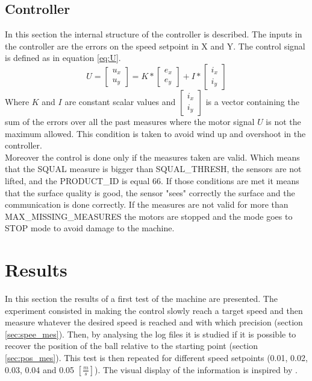 \documentclass[12pt,a4paper, twoside]{article}
\begin{document}
\subsection{Controller} \label{sec:controller}
In this section the internal structure of the controller is described.
The inputs in the controller are the errors on the speed setpoint in X and Y. The control signal is defined as in equation \ref{eq:U}.
\begin{equation}\label{eq:U}
U = 
\begin{bmatrix}
u_x\\
u_y
\end{bmatrix}
= K * 
\begin{bmatrix}
e_x\\
e_y
\end{bmatrix} + I *
\begin{bmatrix}
i_x\\
i_y
\end{bmatrix} 
\end{equation}
Where $K$ and $I$ are constant scalar values and $\begin{bmatrix}i_x\\i_y\end{bmatrix}$ is a vector containing the sum of the errors over all the past measures where the motor signal $U$ is not the maximum allowed. This condition is taken to avoid wind up and overshoot in the controller.\\
Moreover the control is done only if the measures taken are valid. Which means that the SQUAL measure is bigger than SQUAL\_THRESH, the sensors are not lifted, and the PRODUCT\_ID is equal 66.
If those conditions are met it means that the surface quality is good, the sensor "sees" correctly the surface and the communication is done correctly.
If the measures are not valid for more than MAX\_MISSING\_MEASURES the motors are stopped and the mode goes to STOP mode to avoid damage to the machine.
\newpage
\section{Results} \label{sec:results}
In this section the results of a first test of the machine are presented. The experiment consisted in making the control slowly reach a target speed and then measure whatever the desired speed is reached and with which precision (section \ref{sec:spee_mes}). Then, by analysing the log files it is studied if it is possible to recover the position of the ball relative to the starting point (section \ref{sec:pos_mes}). This test is then repeated for different speed setpoints (0.01, 0.02, 0.03, 0.04 and 0.05 $[\frac{m}{s}]$). The visual display of the information is inspired by \cite{Tufte}.
\end{document}
